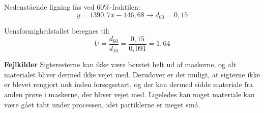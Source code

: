 Nedenstående ligning fås ved 60\%-fraktilen:
\begin{equation}
	y = 1390,\!7x - 146,\!68 \rightarrow d_{60}=0,\!15
\end{equation}

Uensformighedstallet beregnes til:
\begin{equation}
	U=\frac{d_{60}}{d_{10}} = \frac{0,\!15}{0,\!091} = 1,\!64
\end{equation}

\textbf{Fejlkilder}
\newline
Sigteresterne kan ikke være børstet helt ud af maskerne, og alt materialet bliver dermed ikke vejet med. Derudover er det muligt, at sigterne ikke er blevet rengjort nok inden forsøgsstart, og der kan dermed sidde materiale fra anden prøve i maskerne, der bliver vejet med.
\newline \indent{     }  Ligeledes kan noget materiale kan være gået tabt under processen, idet partiklerne er meget små. 